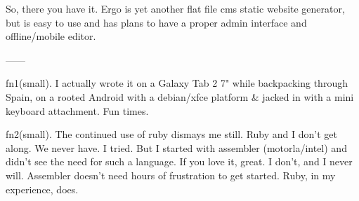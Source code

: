 So, there you have it. Ergo is yet another flat file cms static website generator, but is easy to use and has plans to have a proper admin interface and offline/mobile editor.

------

fn1(small). I actually wrote it on a Galaxy Tab 2 7" while backpacking through Spain, on a rooted Android with a debian/xfce platform & jacked in with a mini keyboard attachment. Fun times.

fn2(small).  The continued use of ruby dismays me still. Ruby and I don't get along. We never have. I tried. But I started with assembler (motorla/intel) and didn't see the need for such a language. If you love it, great. I don't, and I never will. Assembler doesn't need hours of frustration to get started. Ruby, in my experience, does.



